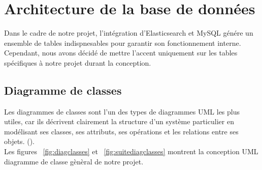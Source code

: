 \section{Architecture de la base de données}
\noindent
Dans le cadre de notre projet, l'intégration d'Elasticsearch et MySQL génére un ensemble de tables indispnesables pour garantir son fonctionnement interne. Cependant, nous avons décidé de mettre l'accent uniquement sur les tables
spécifiques à notre projet durant la conception.

\subsection{Diagramme de classes}
\noindent
Les diagrammes de classes sont l'un des types de diagrammes UML les plus utiles, car ils décrivent clairement la structure d’un système particulier en modélisant ses classes, ses attributs, ses opérations et les relations entre ses objets.  (\cite{lucidcharts:classdiagram}). \\
Les figures ~\ref{fig:diagclasses} et ~\ref{fig:suitediagclasses} montrent la conception UML diagramme de classe gènèral de notre projet.

